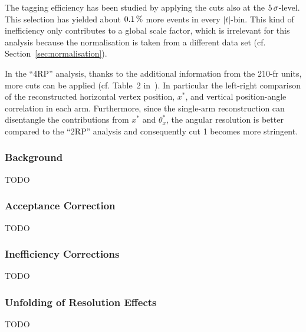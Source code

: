 The tagging efficiency has been studied by applying the cuts also at the $5\,{\rm \sigma}$-level. This selection has yielded about $0.1\,{\rm \%}$ more events in every $|t|$-bin. This kind of inefficiency only contributes to a global scale factor, which is irrelevant for this analysis because the normalisation is taken from a different data set (cf. Section~\ref{sec:normalisation}).

In the ``4RP'' analysis, thanks to the additional information from the 210-fr units, more cuts can be applied (cf. Table~2 in~\cite{epl101-el}). In particular the left-right comparison of the reconstructed horizontal vertex position, $x^*$, and vertical position-angle correlation in each arm. Furthermore, since the single-arm reconstruction can disentangle the contributions from $x^*$ and $\theta^*_x$, the angular resolution is better compared to the ``2RP'' analysis and consequently cut 1 becomes more stringent.






\subsubsection{Background}
\label{sec:background}

TODO


\subsubsection{Acceptance Correction}
\label{sec:acc corr}

TODO


\subsubsection{Inefficiency Corrections}
\label{sec:ineff corr}

TODO


\subsubsection{Unfolding of Resolution Effects}
\label{sec:unfolding}

TODO

